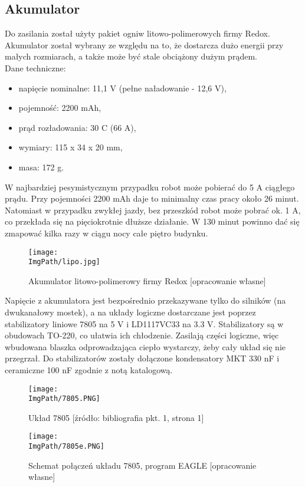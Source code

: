 \documentclass[a4paper,12pt,twoside,openany]{report}
\newcommand{\ImgPath}{.}
\begin{document}
\subsection{Akumulator}

Do zasilania został użyty pakiet ogniw litowo-polimerowych firmy Redox. Akumulator został wybrany ze względu na to, że dostarcza dużo energii przy małych rozmiarach, a także może być stale obciążony dużym prądem. \\
Dane techniczne:
\begin{itemize}
\item napięcie nominalne: 11,1 V (pełne naładowanie - 12,6 V),
\item pojemność: 2200 mAh,
\item prąd rozładowania: 30 C (66 A),
\item wymiary: 115 x 34 x 20 mm,
\item masa: 172 g.
\end{itemize}

W najbardziej pesymistycznym przypadku robot może pobierać do 5 A ciągłego prądu. Przy pojemności 2200 mAh daje to minimalny czas pracy około 26 minut. Natomiast w przypadku zwykłej jazdy, bez przeszkód robot może pobrać ok. 1 A, co przekłada się na pięciokrotnie dłuższe działanie. W 130 minut powinno dać się zmapować kilka razy w ciągu nocy całe piętro budynku.

\begin{figure}[!htbp]
	\begin{center}
\centering
\texttt{[image: \\ImgPath/lipo.jpg]}
\end{center}
	\caption{Akumulator litowo-polimerowy firmy Redox [opracowanie własne]}
	\label{schematKomunikacji}
\end{figure}

\newpage

Napięcie z akumulatora jest bezpośrednio przekazywane tylko do silników (na dwukanałowy mostek), a na układy logiczne dostarczane jest poprzez stabilizatory liniowe 7805 na 5 V i LD1117VC33 na 3.3 V. Stabilizatory są w obudowach TO-220, co ułatwia ich chłodzenie. Zasilają części logiczne, więc wbudowana blaszka odprowadzająca ciepło wystarczy, żeby cały układ się nie przegrzał. Do stabilizatorów zostały dołączone kondensatory MKT 330 nF i ceramiczne 100 nF zgodnie z notą katalogową.

\begin{figure}[!htbp]
	\begin{center}
\centering
\texttt{[image: \\ImgPath/7805.PNG]}
\end{center}
	\caption{Układ 7805 [źródło: bibliografia pkt. 1, strona 1]}
	\label{schematKomunikacji}
\end{figure}
\newpage
\begin{figure}[!htbp]
	\begin{center}
\centering
\texttt{[image: \\ImgPath/7805e.PNG]}
\end{center}
	\caption{Schemat połączeń układu 7805, program EAGLE [opracowanie własne]}
	\label{schematKomunikacji}
\end{figure}
\end{document}
